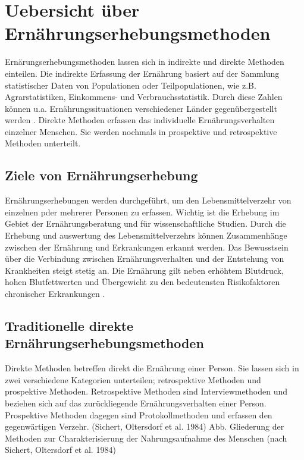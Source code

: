 \section{Uebersicht über Ernährungserhebungsmethoden}

Ernärungserhebungsmethoden lassen sich in indirekte und direkte Methoden einteilen. Die indirekte Erfassung der Ernährung basiert auf der Sammlung statistischer Daten von Populationen oder Teilpopulationen, wie z.B. Agrarstatistiken, Einkommens- und Verbrauchsstatistik. Durch diese Zahlen können u.a. Ernährungssituationen verschiedener Länder gegenübergestellt werden \cite{muller2007ernahrungsmedizinische}. Direkte Methoden erfassen das individuelle Ernährungsverhalten einzelner Menschen. Sie werden nochmals in prospektive und retrospektive Methoden unterteilt. 


\subsection{Ziele von Ernährungserhebung}

Ernährungserhebungen werden durchgeführt, um den Lebensmittelverzehr von einzelnen pder mehrerer Personen zu erfassen. Wichtig ist die Erhebung im Gebiet der Ernährungsberatung und für wissenschaftliche Studien. Durch die Erhebung und auswertung des Lebensmittelverzehrs können Zusammenhänge zwischen der Ernährung und Erkrankungen erkannt werden. Das Bewusstsein über die Verbindung zwischen Ernährungsverhalten und der Entstehung von Krankheiten steigt stetig an. Die Ernährung gilt neben erhöhtem Blutdruck, hohen Blutfettwerten und Übergewicht zu den bedeutensten Risikofaktoren chronischer Erkrankungen \cite{hurrelmann2004einfuhrung}.

\subsection{Traditionelle direkte Ernährungserhebungsmethoden}

Direkte Methoden betreffen direkt die Ernährung einer Person.  Sie lassen sich in zwei verschiedene Kategorien unterteilen; retrospektive Methoden und prospektive Methoden. Retrospektive Methoden sind Interviewmethoden und beziehen sich auf das zurückliegende Ernährungsverhalten einer Person.  Prospektive Methoden dagegen sind Protokollmethoden und erfassen den gegenwärtigen Verzehr. (Sichert, Oltersdorf et al. 1984)
Abb. Gliederung der Methoden zur Charakterisierung der Nahrungsaufnahme des Menschen (nach Sichert, Oltersdorf et al. 1984)

